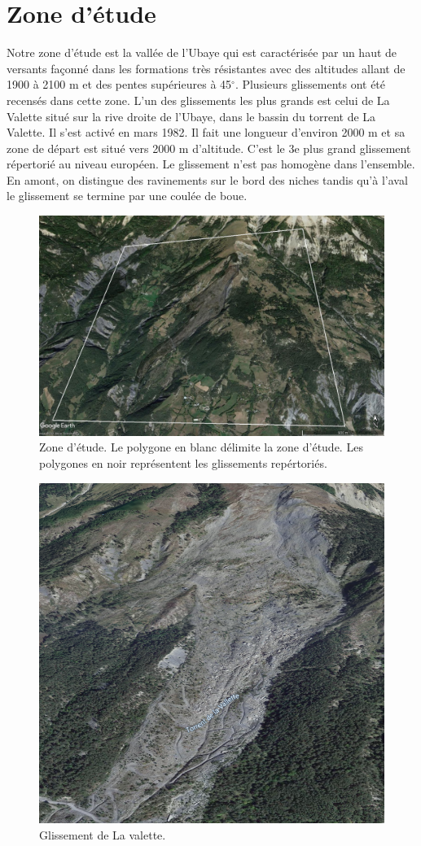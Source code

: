 \documentclass[11pt, openany]{report}
\begin{document}
\section{Zone d'étude}
Notre zone d'étude est la vallée de l'Ubaye qui est caractérisée par un haut de versants façonné dans les formations très résistantes avec des altitudes allant de 1900 à 2100 m et des pentes supérieures à 45$^{\circ}$. Plusieurs glissements ont été recensés dans cette zone. L'un des glissements les plus grands est celui de La Valette situé sur la rive droite de l'Ubaye, dans le bassin du torrent de La Valette. Il s'est activé en mars 1982. Il fait une longueur d'environ 2000 m et sa zone de départ est situé vers 2000 m d'altitude. C'est le 3e plus grand glissement répertorié au niveau européen. Le glissement n'est pas homogène dans l'ensemble. En amont, on distingue des ravinements sur le bord des niches tandis qu'à l'aval le glissement se termine par une coulée de boue.

\begin{figure}[H]
  \centering
  \includegraphics[width=0.6\linewidth]{zone_etude_val.jpg}
  \caption{Zone d'étude. Le polygone en blanc délimite la zone d'étude. Les polygones en noir représentent les glissements repértoriés.}
\end{figure}

\begin{figure}[H]
  \centering
  \includegraphics[width=0.6\linewidth]{lavalette.png}
  \caption{Glissement de La valette.}
\end{figure}
\end{document}
